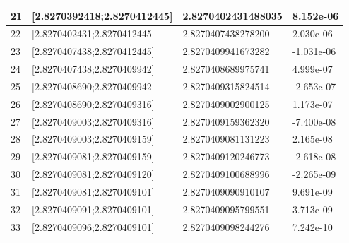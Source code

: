 \documentclass[a4paper, 11pt]{article}
\begin{document}
\begin{table}[H]
\begin{tabular}{llll}
\multicolumn{1}{|l|}{21} & \multicolumn{1}{l|}{{[}2.8270392418;2.8270412445{]}} & \multicolumn{1}{l|}{2.8270402431488035} & \multicolumn{1}{l|}{8.152e-06} \\ \hline
\multicolumn{1}{|l|}{22} & \multicolumn{1}{l|}{{[}2.8270402431;2.8270412445{]}} & \multicolumn{1}{l|}{2.8270407438278200} & \multicolumn{1}{l|}{2.030e-06} \\ \hline
\multicolumn{1}{|l|}{23} & \multicolumn{1}{l|}{{[}2.8270407438;2.8270412445{]}} & \multicolumn{1}{l|}{2.8270409941673282} & \multicolumn{1}{l|}{-1.031e-06} \\ \hline
\multicolumn{1}{|l|}{24} & \multicolumn{1}{l|}{{[}2.8270407438;2.8270409942{]}} & \multicolumn{1}{l|}{2.8270408689975741} & \multicolumn{1}{l|}{4.999e-07} \\ \hline
\multicolumn{1}{|l|}{25} & \multicolumn{1}{l|}{{[}2.8270408690;2.8270409942{]}} & \multicolumn{1}{l|}{2.8270409315824514} & \multicolumn{1}{l|}{-2.653e-07} \\ \hline
\multicolumn{1}{|l|}{26} & \multicolumn{1}{l|}{{[}2.8270408690;2.8270409316{]}} & \multicolumn{1}{l|}{2.8270409002900125} & \multicolumn{1}{l|}{1.173e-07} \\ \hline
\multicolumn{1}{|l|}{27} & \multicolumn{1}{l|}{{[}2.8270409003;2.8270409316{]}} & \multicolumn{1}{l|}{2.8270409159362320} & \multicolumn{1}{l|}{-7.400e-08} \\ \hline
\multicolumn{1}{|l|}{28} & \multicolumn{1}{l|}{{[}2.8270409003;2.8270409159{]}} & \multicolumn{1}{l|}{2.8270409081131223} & \multicolumn{1}{l|}{2.165e-08} \\ \hline
\multicolumn{1}{|l|}{29} & \multicolumn{1}{l|}{{[}2.8270409081;2.8270409159{]}} & \multicolumn{1}{l|}{2.8270409120246773} & \multicolumn{1}{l|}{-2.618e-08} \\ \hline
\multicolumn{1}{|l|}{30} & \multicolumn{1}{l|}{{[}2.8270409081;2.8270409120{]}} & \multicolumn{1}{l|}{2.8270409100688996} & \multicolumn{1}{l|}{-2.265e-09} \\ \hline
\multicolumn{1}{|l|}{31} & \multicolumn{1}{l|}{{[}2.8270409081;2.8270409101{]}} & \multicolumn{1}{l|}{2.8270409090910107} & \multicolumn{1}{l|}{9.691e-09} \\ \hline
\multicolumn{1}{|l|}{32} & \multicolumn{1}{l|}{{[}2.8270409091;2.8270409101{]}} & \multicolumn{1}{l|}{2.8270409095799551} & \multicolumn{1}{l|}{3.713e-09} \\ \hline
\multicolumn{1}{|l|}{33} & \multicolumn{1}{l|}{{[}2.8270409096;2.8270409101{]}} & \multicolumn{1}{l|}{2.8270409098244276} & \multicolumn{1}{l|}{7.242e-10} \\ \hline

\end{tabular}
\end{table}
\end{document}
